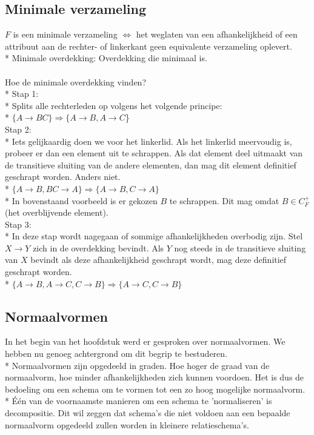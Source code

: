 \documentclass[10pt]{article}
\begin{document}
\subsection{Minimale verzameling}
$F$ is een minimale verzameling $\Leftrightarrow$ het weglaten van een afhankelijkheid of een attribuut aan de rechter- of linkerkant geen equivalente verzameling oplevert.\\*
Minimale overdekking: Overdekking die minimaal is.\\\\
Hoe de minimale overdekking vinden?\\*
Stap 1:\\*
Splits alle rechterleden op volgens het volgende principe:\\*
$\{A \rightarrow BC\} \Rightarrow \{A \rightarrow B, A \rightarrow C$\}\\
Stap 2:\\*
Iets gelijkaardig doen we voor het linkerlid. Als het linkerlid meervoudig is, probeer er dan een element uit te schrappen. Als dat element deel uitmaakt van de transitieve sluiting van de andere elementen, dan mag dit element definitief geschrapt worden. Anders niet.\\*
$\{A \rightarrow B, BC \rightarrow A\} \Rightarrow \{A \rightarrow B, C \rightarrow A\}$\\*
In bovenstaand voorbeeld is er gekozen $B$ te schrappen. Dit mag omdat $B \in C_F^+$ (het overblijvende element).\\
Stap 3:\\*
In deze stap wordt nagegaan of sommige afhankelijkheden overbodig zijn. Stel $X \rightarrow Y$ zich in de overdekking bevindt. Als $Y$ nog steeds in de transitieve sluiting van $X$ bevindt als deze afhankelijkheid geschrapt wordt, mag deze definitief geschrapt worden.\\*
$\{A \rightarrow B, A \rightarrow C, C \rightarrow B\} \Rightarrow \{A \rightarrow C, C \rightarrow B\}$
\subsection{Normaalvormen}
In het begin van het hoofdstuk werd er gesproken over normaalvormen. We hebben nu genoeg achtergrond om dit begrip te bestuderen.\\*
Normaalvormen zijn opgedeeld in graden. Hoe hoger de graad van de normaalvorm, hoe minder afhankelijkheden zich kunnen voordoen. Het is dus de bedoeling om een schema om te vormen tot een zo hoog mogelijke normaalvorm.\\*
\'E\'en van de voornaamste manieren om een schema te 'normaliseren' is decompositie. Dit wil zeggen dat schema's die niet voldoen aan een bepaalde normaalvorm opgedeeld zullen worden in kleinere relatieschema's.
\end{document}

